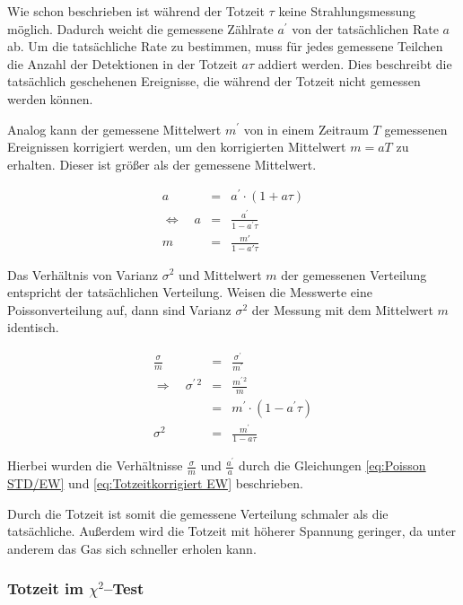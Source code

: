 \documentclass[12pt,a4paper]{scrartcl}
\numberwithin{equation}{section} %
\begin{document}
Wie schon beschrieben ist während der Totzeit $\tau$ keine Strahlungsmessung möglich. Dadurch weicht die gemessene Zählrate $a^\prime$ von der tatsächlichen Rate $a$ ab. Um die tatsächliche Rate zu bestimmen, muss für jedes gemessene Teilchen die Anzahl der Detektionen in der Totzeit $a\tau$ addiert werden. Dies beschreibt die tatsächlich geschehenen Ereignisse, die während der Totzeit nicht gemessen werden können.

Analog kann der gemessene Mittelwert $m^\prime$ von in einem Zeitraum $T$ gemessenen Ereignissen korrigiert werden, um den korrigierten Mittelwert $m=aT$ zu erhalten. Dieser ist größer als der gemessene Mittelwert.

\begin{eqnarray}
	a &=& a^\prime \cdot(1 + a\tau) \\
	\Leftrightarrow\quad a &=& \frac{a^\prime}{1-a^\prime\tau} \label{eq:Totzeitkorrigiert Rate}\\
	m &=&\frac{m'}{1-a'\tau} \label{eq:Totzeitkorrigiert EW}
\end{eqnarray}

\noindent
Das Verhältnis von Varianz $\sigma^2$ und Mittelwert $m$ der gemessenen Verteilung entspricht der tatsächlichen Verteilung. Weisen die Messwerte eine Poissonverteilung auf, dann sind Varianz $\sigma^2$ der Messung mit dem Mittelwert $m$ identisch.

\begin{eqnarray}
	\frac{\sigma}{m}&=&\frac{\sigma^\prime}{m^\prime}\\
	\Rightarrow\quad \sigma^{\prime\,2} & = &\frac{m^{\prime\,2}}{m} \\
		&=& m^\prime\cdot(1-a^\prime\tau) \\
	\sigma^2
		&=& \frac{m^\prime}{1-a\tau}
\end{eqnarray}

\noindent
Hierbei wurden die Verhältnisse $\frac{\sigma}{m}$ und $\frac{a^\prime}{a}$ durch die Gleichungen \eqref{eq:Poisson STD/EW} und \eqref{eq:Totzeitkorrigiert EW} beschrieben.

Durch die Totzeit ist somit die gemessene Verteilung schmaler als die tatsächliche. Außerdem wird die Totzeit mit höherer Spannung geringer, da unter anderem das Gas sich schneller erholen kann.

\hypertarget{einfluss-der-totzeit}{%
\subsubsection{Totzeit im $\chi^2$--Test}\label{einfluss-der-totzeit}}
\end{document}
